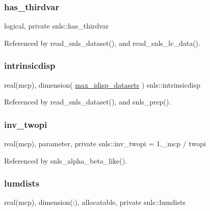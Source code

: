 \subsubsection{\texorpdfstring{has\+\_\+thirdvar}{has\_thirdvar}}
{\footnotesize\ttfamily logical, private snls\+::has\+\_\+thirdvar\hspace{0.3cm}{\ttfamily [private]}}



Referenced by read\+\_\+snls\+\_\+dataset(), and read\+\_\+snls\+\_\+lc\+\_\+data().

\mbox{\label{namespacesnls_aea5409adea753b625ccfc1d60e5705d5}} 
\subsubsection{\texorpdfstring{intrinsicdisp}{intrinsicdisp}}
{\footnotesize\ttfamily real(mcp), dimension( \mbox{\hyperlink{namespacesnls_a82d4a9b322c284cf9bba27e6c86cb4f9}{max\+\_\+idisp\+\_\+datasets}} ) snls\+::intrinsicdisp\hspace{0.3cm}{\ttfamily [private]}}



Referenced by read\+\_\+snls\+\_\+dataset(), and snls\+\_\+prep().

\mbox{\label{namespacesnls_af91b609e54e5ac91712f0bb5303b5652}} 
\subsubsection{\texorpdfstring{inv\+\_\+twopi}{inv\_twopi}}
{\footnotesize\ttfamily real(mcp), parameter, private snls\+::inv\+\_\+twopi = 1.\+\_\+mcp / twopi\hspace{0.3cm}{\ttfamily [private]}}



Referenced by snls\+\_\+alpha\+\_\+beta\+\_\+like().

\mbox{\label{namespacesnls_a5cc70993d1d6e6f59706685f982260ee}} 
\subsubsection{\texorpdfstring{lumdists}{lumdists}}
{\footnotesize\ttfamily real(mcp), dimension(\+:), allocatable, private snls\+::lumdists\hspace{0.3cm}{\ttfamily [private]}}



